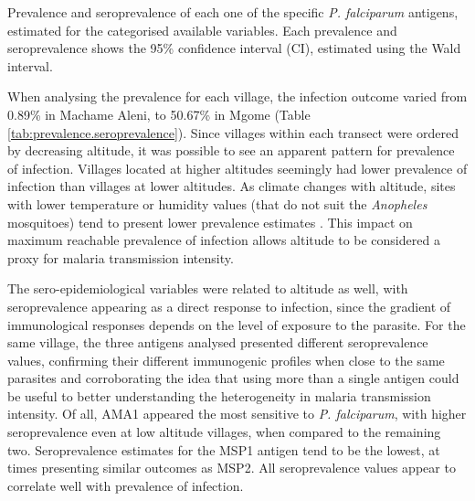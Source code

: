 \begin{table}[H]
\centering
\caption[Prevalence and seroprevalence for each categorical variable]{Prevalence and seroprevalence of each one of the specific \textit{P. falciparum} antigens, estimated for the categorised available variables. Each prevalence and seroprevalence shows the 95\% confidence interval (CI), estimated using the Wald interval.}
\label{tab:prevalence.categories}
\begin{adjustbox}{width=1\linewidth}

\end{adjustbox}
\end{table}
\newpage

When analysing the prevalence for each village, the infection outcome varied from 0.89\% in Machame Aleni, to 50.67\% in Mgome (Table \ref{tab:prevalence.seroprevalence}).
Since villages within each transect were ordered by decreasing altitude, it was possible to see an apparent pattern for prevalence of infection.
Villages located at higher altitudes seemingly had lower prevalence of infection than villages at lower altitudes.
As climate changes with altitude, sites with lower temperature or humidity values (that do not suit the \textit{Anopheles} mosquitoes) tend to present lower prevalence estimates \cite{lindsay1996climate}.
This impact on maximum reachable prevalence of infection allows altitude to be considered a proxy for malaria transmission intensity.

The sero-epidemiological variables were related to altitude as well, with seroprevalence appearing as a direct response to infection, since the gradient of immunological responses depends on the level of exposure to the parasite.
For the same village, the three antigens analysed presented different seroprevalence values, confirming their different immunogenic profiles when close to the same parasites and corroborating the idea that using more than a single antigen could be useful to better understanding the heterogeneity in malaria transmission intensity.
Of all, AMA1 appeared the most sensitive to \textit{P. falciparum}, with higher seroprevalence even at low altitude villages, when compared to the remaining two.
Seroprevalence estimates for the MSP1 antigen tend to be the lowest, at times presenting similar outcomes as MSP2.
All seroprevalence values appear to correlate well with prevalence of infection.
\\

